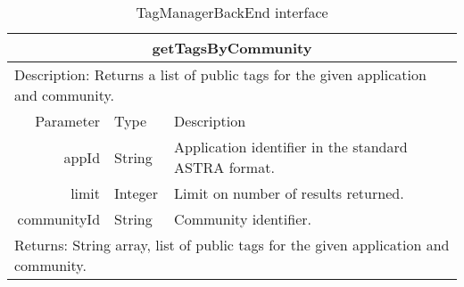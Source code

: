 \begin{table}[h!]
\begin{center}
\begin{tabular}{||r|l|l||}
		
		\hline \hline
		\multicolumn{3}{||c||}{\bfseries{getTagsByCommunity}} \\
		\hline
		\hline 
		\multicolumn{3}{||l||}{Description: Returns a list of public tags for the
		given application and community.} \\ 
		\hline \hline 
			Parameter & Type & Description \\
		\hline \hline
			appId & String & Application identifier in the standard ASTRA format. \\
			limit & Integer & Limit on number of results returned. \\
			communityId & String & Community identifier. \\
		\hline \hline
		\multicolumn{3}{||l||}{Returns: String array, list of public tags for the
		given application and community.} \\
		\hline
		\hline
		
		\end{tabular}
		\caption{\label{table:tmbe-interface-1} TagManagerBackEnd interface}
	\end{center}
\end{table}

